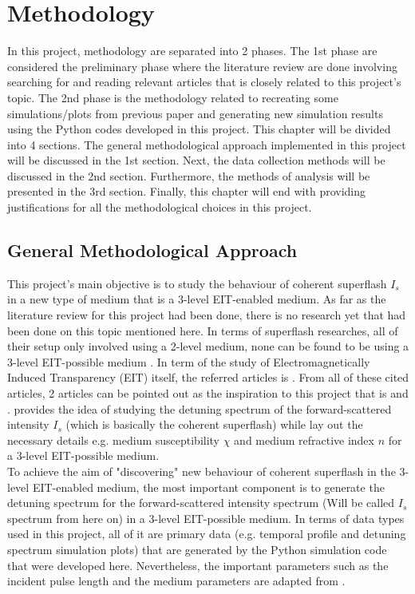 \chapter{Methodology}
In this project, methodology are separated into 2 phases. The 1st phase are considered the preliminary phase where the literature review are done involving searching for and reading relevant articles that is closely related to this project's topic. The 2nd phase is the methodology related to recreating some simulations/plots from previous paper and generating new simulation results using the Python codes developed in this project. This chapter will be divided into 4 sections. The general methodological approach implemented in this project will be discussed in the 1st section. Next, the data collection methods will be discussed in the 2nd section. Furthermore, the methods of analysis will be presented in the 3rd section. Finally, this chapter will end with providing justifications for all the methodological choices in this project.

\section{General Methodological Approach}
This project's main objective is to study the behaviour of coherent superflash $I_{s}$ in a new type of medium that is a 3-level EIT-enabled medium. As far as the literature review for this project had been done, there is no research yet that had been done on this topic mentioned here. In terms of superflash researches, all of their setup only involved using a 2-level medium, none can be found to be using a 3-level EIT-possible medium \cite{Kwong2014, Kwong2015, Kwong2017, Kwong2020}. In term of the study of Electromagnetically Induced Transparency (EIT) itself, the referred articles is \cite{}. From all of these cited articles, 2 articles can be pointed out as the inspiration to this project that is \cite{Kwong2014} and \cite{jeong2010slow}. \cite{Kwong2014} provides the idea of studying the detuning spectrum of the forward-scattered intensity $I_{s}$ (which is basically the coherent superflash) while \cite{jeong2010slow} lay out the necessary details e.g. medium susceptibility $\chi$ and medium refractive index $n$ for a 3-level EIT-possible medium.\\

To achieve the aim of "discovering" new behaviour of coherent superflash in the 3-level EIT-enabled medium, the most important component is to generate the detuning spectrum for the forward-scattered intensity spectrum (Will be called $I_{s}$ spectrum from here on) in a 3-level EIT-possible medium. In terms of data types used in this project, all of it are primary data (e.g. temporal profile and detuning spectrum simulation plots) that are generated by the Python simulation code that were developed here. Nevertheless, the important parameters such as the incident pulse length and the medium parameters are adapted from \cite{jeong2010slow}.\\

